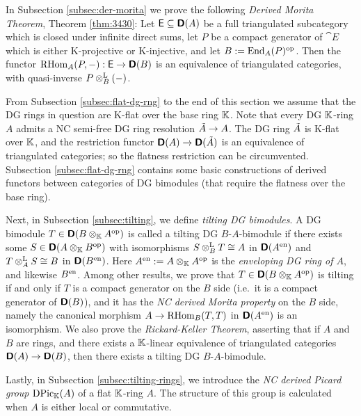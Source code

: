 In Subsection \ref{subsec:der-morita} we prove the following {\em 
Derived Morita Theorem}, Theorem \ref{thm:3430}:
Let $\operatorname{\mathsf{E}} \subseteq \boldsymbol{\mathsf{D}}(A)$ be a full triangulated subcategory which is 
closed under infinite direct sums, let $P$ be a compact generator of 
$\cat{E}$ which is either K-projective or K-injective, and let
$B := \operatorname{End}_{A}(P)^{\mathrm{op}}$. Then the functor 
$\operatorname{RHom}_{A}(P, -) : \operatorname{\mathsf{E}} \to \boldsymbol{\mathsf{D}}(B)$
is an equivalence of triangulated categories, with quasi-inverse 
$P \otimes^{\mathrm{L}}_{B} (-)$. 

From Subsection \ref{subsec:flat-dg-rng} to the end of this section 
we assume that the DG rings in question are K-flat over the base ring $\mathbb{K}$. 
Note that every DG $\mathbb{K}$-ring $A$ admits a NC semi-free DG ring resolution 
$\tilde{A} \to A$. The DG ring $\tilde{A}$ is K-flat over $\mathbb{K}$, and the 
restriction functor $\boldsymbol{\mathsf{D}}(A) \to \boldsymbol{\mathsf{D}}(\tilde{A})$ is an equivalence of 
triangulated categories; so the flatness restriction can be  
circumvented. Subsection \ref{subsec:flat-dg-rng} contains some basic 
constructions of derived functors between categories of DG bimodules (that 
require the flatness over the base ring). 

Next, in Subsection \ref{subsec:tilting}, we define {\em tilting DG 
bimodules}. A DG bimodule $T \in \boldsymbol{\mathsf{D}}(B \otimes_{\mathbb{K}} A^{\mathrm{op}})$ is called
a tilting DG $B$-$A$-bimodule if there exists some 
$S \in \lb \dcat{D}(A \ot_{\K} B^{\mrm{op}})$ 
with isomorphisms $S \otimes^{\mathrm{L}}_{B} T \cong A$ in 
$\boldsymbol{\mathsf{D}}(A^{\mathrm{en}})$ and $T \otimes^{\mathrm{L}}_{A} S \cong B$ in 
$\boldsymbol{\mathsf{D}}(B^{\mathrm{en}})$. Here 
$A^{\mathrm{en}} := A \otimes_{\mathbb{K}} A^{\mathrm{op}}$ is the {\em enveloping DG ring of 
$A$}, and likewise $B^{\mathrm{en}}$. Among other results, we prove that 
$T \in \boldsymbol{\mathsf{D}}(B \otimes_{\mathbb{K}} A^{\mathrm{op}})$
is tilting if and only if $T$ is a compact generator on the $B$ side
(i.e.\ it is a compact generator of $ \boldsymbol{\mathsf{D}}(B)$), and it 
has the {\em NC derived Morita property} on the $B$ side, namely the canonical
morphism $A \to \operatorname{RHom}_{B}(T, T)$
in $\boldsymbol{\mathsf{D}}(A^{\mathrm{en}})$ is an isomorphism.
We also prove the {\em Rickard-Keller Theorem}, asserting that if $A$ and $B$ 
are rings, and there exists a $\mathbb{K}$-linear equivalence of 
triangulated categories
$\boldsymbol{\mathsf{D}}(A) \to \boldsymbol{\mathsf{D}}(B)$, then there exists a tilting DG $B$-$A$-bimodule. 

Lastly, in Subsection \ref{subsec:tilting-rings}, we introduce the {\em NC
derived Picard group} $\operatorname{DPic}_{\mathbb{K}}(A)$ of a flat $\mathbb{K}$-ring $A$. The 
structure of this group is calculated when $A$ is either local or commutative.  


